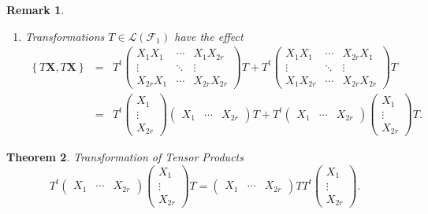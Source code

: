 \documentclass[aps,preprint]{revtex4}
\newtheorem{theorem}{Theorem}
\newtheorem{remark}[theorem]{Remark}
\begin{document}
\begin{remark}
\begin{enumerate}
\item Transformations $T\in \mathcal{L}\left( \mathcal{F}_{1}\right) $ have
the effect 
\begin{eqnarray}
\left\{ T\boldsymbol{X},T\boldsymbol{X}\right\} &=&T^{t}\left( 
\begin{array}{ccc}
X_{1}X_{1} & \cdots & X_{1}X_{2r} \\ 
\vdots & \ddots & \vdots \\ 
X_{2r}X_{1} & \cdots & X_{2r}X_{2r}%
\end{array}%
\right) T+T^{t}\left( 
\begin{array}{ccc}
X_{1}X_{1} & \cdots & X_{2r}X_{1} \\ 
\vdots & \ddots & \vdots \\ 
X_{1}X_{2r} & \cdots & X_{2r}X_{2r}%
\end{array}%
\right) T \\
&=&T^{t}\left( 
\begin{array}{c}
X_{1} \\ 
\vdots \\ 
X_{2r}%
\end{array}%
\right) \left( 
\begin{array}{ccc}
X_{1} & \cdots & X_{2r}%
\end{array}%
\right) T+T^{t}\left( 
\begin{array}{ccc}
X_{1} & \cdots & X_{2r}%
\end{array}%
\right) \left( 
\begin{array}{c}
X_{1} \\ 
\vdots \\ 
X_{2r}%
\end{array}%
\right) T.
\end{eqnarray}
\end{enumerate}
\end{remark}

\begin{theorem}
Transformation of Tensor Products \label{Transformation of Row Column Tensor
Products} 
\begin{equation}
T^{t}\left( 
\begin{array}{ccc}
X_{1} & \cdots & X_{2r}%
\end{array}%
\right) \left( 
\begin{array}{c}
X_{1} \\ 
\vdots \\ 
X_{2r}%
\end{array}%
\right) T=\left( 
\begin{array}{ccc}
X_{1} & \cdots & X_{2r}%
\end{array}%
\right) TT^{t}\left( 
\begin{array}{c}
X_{1} \\ 
\vdots \\ 
X_{2r}%
\end{array}%
\right) .
\end{equation}
\end{theorem}
\end{document}
